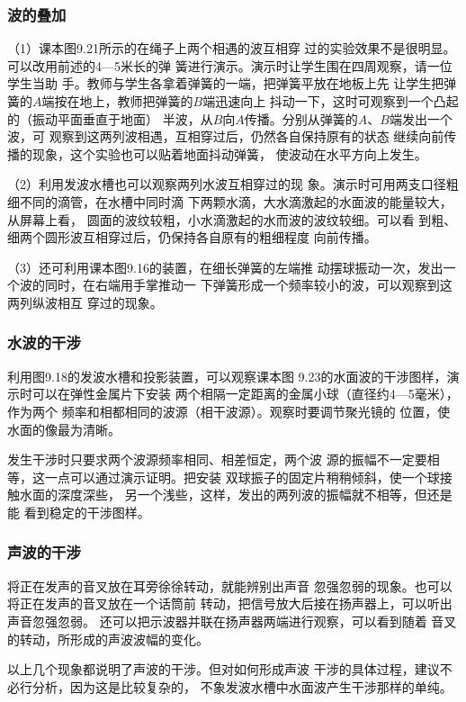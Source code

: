\subsubsection{波的叠加}
（1）课本图9.21所示的在绳子上两个相遇的波互相穿
过的实验效果不是很明显。可以改用前述的4—5米长的弹
簧进行演示。演示时让学生围在四周观察，请一位学生当助
手。教师与学生各拿着弹簧的一端，把弹簧平放在地板上先
让学生把弹簧的$A$端按在地上，教师把弹簧的$B$端迅速向上
抖动一下，这时可观察到一个凸起的（振动平面垂直于地面）
半波，从$B$向$A$传播。分别从弹簧的$A$、$B$端发出一个波，可
观察到这两列波相遇，互相穿过后，仍然各自保持原有的状态
继续向前传播的现象，这个实验也可以贴着地面抖动弹簧，
使波动在水平方向上发生。

（2）利用发波水槽也可以观察两列水波互相穿过的现
象。演示时可用两支口径粗细不同的滴管，在水槽中同时滴
下两颗水滴，大水滴激起的水面波的能量较大，从屏幕上看，
圆面的波纹较粗，小水滴激起的水而波的波纹较细。可以看
到粗、细两个圆形波互相穿过后，仍保持各自原有的粗细程度
向前传播。

（3）还可利用课本图9.16的装置，在细长弹簧的左端推
动摆球振动一次，发出一个波的同时，在右端用手掌推动一
下弹簧形成一个频率较小的波，可以观察到这两列纵波相互
穿过的现象。

\subsubsection{水波的干涉}
利用图9.18的发波水槽和投影装置，可以观察课本图
9.23的水面波的干涉图样，演示时可以在弹性金属片下安装
两个相隔一定距离的金属小球（直径约4—5毫米），作为两个
频率和相都相同的波源（相干波源）。观察时要调节聚光镜的
位置，使水面的像最为清晰。

发生干涉时只要求两个波源频率相同、相差恒定，两个波
源的振幅不一定要相等，这一点可以通过演示证明。把安装
双球振子的固定片稍稍倾斜，使一个球接触水面的深度深些，
另一个浅些，这样，发出的两列波的振幅就不相等，但还是能
看到稳定的干涉图样。

\subsubsection{声波的干涉}
将正在发声的音叉放在耳旁徐徐转动，就能辨别出声音
忽强忽弱的现象。也可以将正在发声的音叉放在一个话筒前
转动，把信号放大后接在扬声器上，可以听出声音忽强忽弱。
还可以把示波器并联在扬声器两端进行观察，可以看到随着
音叉的转动，所形成的声波波幅的变化。

以上几个现象都说明了声波的干涉。但对如何形成声波
干涉的具体过程，建议不必行分析，因为这是比较复杂的，
不象发波水槽中水面波产生干涉那样的单纯。

